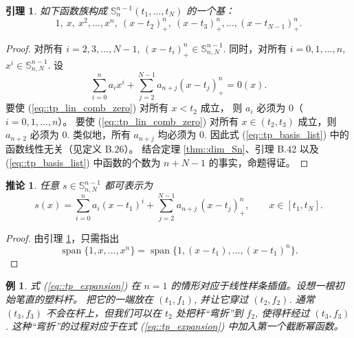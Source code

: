 \documentclass[a4paper]{ctexart}
\newtheorem{lemma}[theorem]{引理}
\newtheorem{corollary}[theorem]{推论}
\newtheorem{example}[theorem]{例}
\numberwithin{theorem}{section}
\numberwithin{equation}{section}
\numberwithin{figure}{section}
\numberwithin{remark}{section}
\begin{document}
\begin{lemma}
    \label{lem::tp_basis}
如下函数族构成 $\mathbb{S}^{n-1}_{n}(t_1,\ldots,t_N)$ 的一个基：
\begin{equation}
\label{eq::tp_basis_list}
1,\ x,\ x^{2},\ldots,x^{n},\ (x-t_2)_{+}^{n},\ (x-t_3)_{+}^{n},\ldots,(x-t_{N-1})_{+}^{n}.
\end{equation}
\end{lemma}

\begin{proof}
对所有 $i=2,3,\ldots,N-1$, $(x-t_i)_{+}^{n}\in \mathbb{S}^{n-1}_{n,N}$.
同时，对所有 $i=0,1,\ldots,n$, $x^{i}\in \mathbb{S}^{n-1}_{n,N}$. 设
\begin{equation}
\label{eq::tp_lin_comb_zero}
\sum_{i=0}^{n} a_i x^{i} + \sum_{j=2}^{N-1} a_{n+j}(x-t_j)_{+}^{n}=0(x).
\end{equation}
要使 (\ref{eq::tp_lin_comb_zero}) 对所有 $x<t_2$ 成立，
则 $a_i$ 必须为 0（$i=0,1,\ldots,n$）。
要使 (\ref{eq::tp_lin_comb_zero}) 对所有 $x\in(t_2,t_3)$ 
成立，则 $a_{n+2}$ 必须为 $0$. 类似地，所有 $a_{n+j}$ 均必须为 $0$. 因此式 (\ref{eq::tp_basis_list}) 中的函数线性无关（见定义 B.26）。
结合定理 \ref{thm::dim_Sn}、引理 B.42 以及 (\ref{eq::tp_basis_list}) 中函数的个数为 $n+N-1$ 的事实，命题得证。
\end{proof}

\begin{corollary}
    \label{cor::tp_expansion}
任意 $s\in \mathbb{S}^{n-1}_{n,N}$ 都可表示为
\begin{equation}
\label{eq::tp_expansion}
s(x)=\sum_{i=0}^{n} a_i (x-t_1)^{i}
+\sum_{j=2}^{N-1} a_{n+j}\,(x-t_j)_{+}^{n},
\qquad x\in[t_1,t_N].
\end{equation}
\end{corollary}

\begin{proof}
由引理 \ref{lem::tp_basis}，只需指出
\[
\operatorname{span}\{1,x,\ldots,x^{n}\}
=\operatorname{span}\{1,(x-t_1),\ldots,(x-t_1)^{n}\}.
\]
\end{proof}

\begin{example}
    \label{ex::n1_linear_interp}
式 (\ref{eq::tp_expansion}) 在 $n=1$ 的情形对应于线性样条插值。设想一根初始笔直的塑料杆。
把它的一端放在 $(t_1,f_1)$, 并让它穿过 $(t_2,f_2)$. 通常 $(t_3,f_3)$ 不会在杆上，但我们可以在 $t_2$ 处把杆“弯折”到 $f_2$, 
使得杆经过 $(t_3,f_3)$. 这种“弯折”的过程对应于在式 (\ref{eq::tp_expansion}) 中加入第一个截断幂函数。
\end{example}
\end{document}
